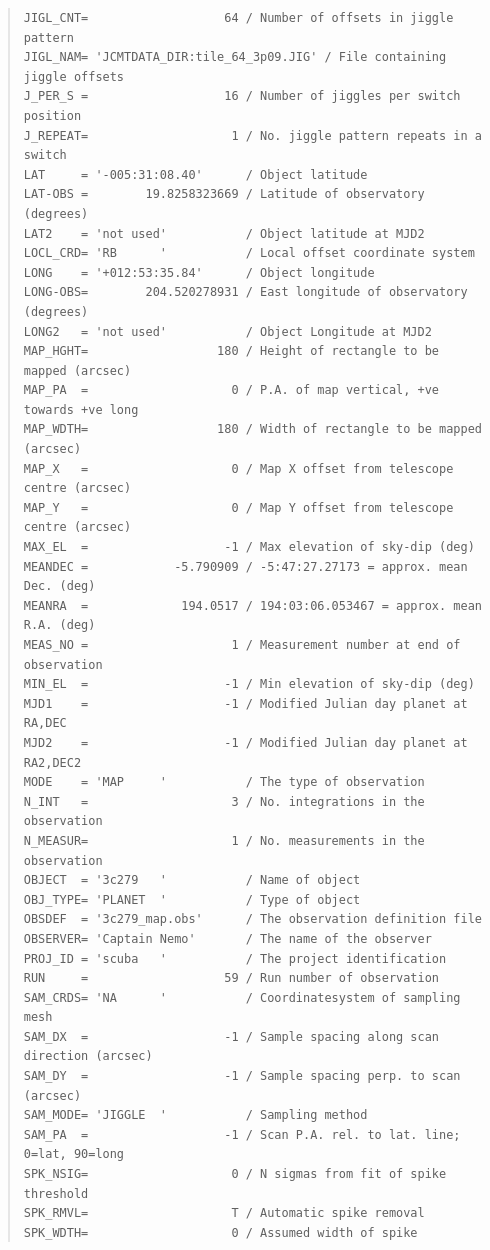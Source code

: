 \documentclass[twoside,11pt]{article}
\newenvironment{myquote}{\begin{quote}\begin{small}}{\end{small}\end{quote}}
\renewcommand{\_}{\texttt{\symbol{95}}}
\begin{document}
\begin{myquote}
\begin{verbatim}
JIGL_CNT=                   64 / Number of offsets in jiggle pattern
JIGL_NAM= 'JCMTDATA_DIR:tile_64_3p09.JIG' / File containing jiggle offsets
J_PER_S =                   16 / Number of jiggles per switch position
J_REPEAT=                    1 / No. jiggle pattern repeats in a switch
LAT     = '-005:31:08.40'      / Object latitude
LAT-OBS =        19.8258323669 / Latitude of observatory (degrees)
LAT2    = 'not used'           / Object latitude at MJD2
LOCL_CRD= 'RB      '           / Local offset coordinate system
LONG    = '+012:53:35.84'      / Object longitude
LONG-OBS=        204.520278931 / East longitude of observatory (degrees)
LONG2   = 'not used'           / Object Longitude at MJD2
MAP_HGHT=                  180 / Height of rectangle to be mapped (arcsec)
MAP_PA  =                    0 / P.A. of map vertical, +ve towards +ve long
MAP_WDTH=                  180 / Width of rectangle to be mapped (arcsec)
MAP_X   =                    0 / Map X offset from telescope centre (arcsec)
MAP_Y   =                    0 / Map Y offset from telescope centre (arcsec)
MAX_EL  =                   -1 / Max elevation of sky-dip (deg)
MEANDEC =            -5.790909 / -5:47:27.27173 = approx. mean Dec. (deg)
MEANRA  =             194.0517 / 194:03:06.053467 = approx. mean R.A. (deg)
MEAS_NO =                    1 / Measurement number at end of observation
MIN_EL  =                   -1 / Min elevation of sky-dip (deg)
MJD1    =                   -1 / Modified Julian day planet at RA,DEC
MJD2    =                   -1 / Modified Julian day planet at RA2,DEC2
MODE    = 'MAP     '           / The type of observation
N_INT   =                    3 / No. integrations in the observation
N_MEASUR=                    1 / No. measurements in the observation
OBJECT  = '3c279   '           / Name of object
OBJ_TYPE= 'PLANET  '           / Type of object
OBSDEF  = '3c279_map.obs'      / The observation definition file
OBSERVER= 'Captain Nemo'       / The name of the observer
PROJ_ID = 'scuba   '           / The project identification
RUN     =                   59 / Run number of observation
SAM_CRDS= 'NA      '           / Coordinatesystem of sampling mesh
SAM_DX  =                   -1 / Sample spacing along scan direction (arcsec)
SAM_DY  =                   -1 / Sample spacing perp. to scan (arcsec)
SAM_MODE= 'JIGGLE  '           / Sampling method
SAM_PA  =                   -1 / Scan P.A. rel. to lat. line; 0=lat, 90=long
SPK_NSIG=                    0 / N sigmas from fit of spike threshold
SPK_RMVL=                    T / Automatic spike removal
SPK_WDTH=                    0 / Assumed width of spike

\end{verbatim}
\end{myquote}
\end{document}
